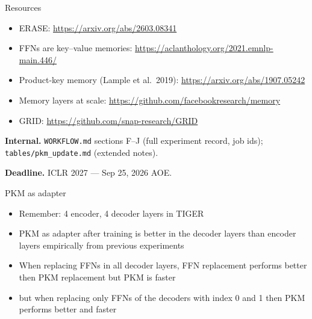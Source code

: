 \documentclass{beamer}
\begin{document}
\begin{frame}{Resources}
\begin{itemize}
  \item ERASE: \url{https://arxiv.org/abs/2603.08341}
  \item FFNs are key--value memories: \url{https://aclanthology.org/2021.emnlp-main.446/}
  \item Product-key memory (Lample et al.\ 2019): \url{https://arxiv.org/abs/1907.05242}
  \item Memory layers at scale: \url{https://github.com/facebookresearch/memory}
  \item GRID: \url{https://github.com/snap-research/GRID}
\end{itemize}

\medskip
\textbf{Internal.} \texttt{WORKFLOW.md} sections F--J (full experiment record,
job ids); \texttt{tables/pkm\_update.md} (extended notes).

\medskip
\textbf{Deadline.} ICLR 2027 --- Sep 25, 2026 AOE.
\end{frame}




\begin{frame}{PKM as adapter}
\begin{itemize}
    \item Remember: 4 encoder, 4 decoder layers in TIGER
    \item PKM as adapter after training is better in the decoder layers than encoder layers empirically from previous experiments
    \item When replacing FFNs in all decoder layers, FFN replacement performs better then PKM replacement but PKM is faster
    \item but when replacing only FFNs of the decoders with index 0 and 1 then PKM performs better and faster


\end{itemize}
\end{frame}
\end{document}
